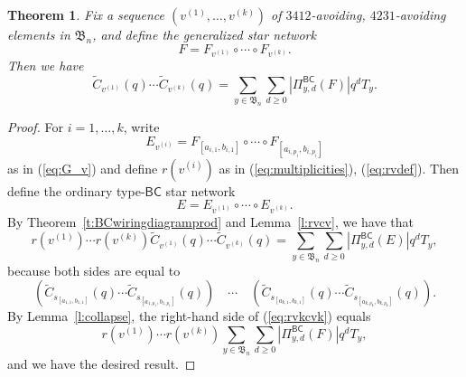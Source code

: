\documentclass[12pt]{amsart}
\newtheorem{thm}{Theorem}[section]
\theoremstyle{definition}
\numberwithin{equation}{section}
\newcommand{\bn}{\mathfrak{B}_n}
\newcommand{\wtc}[2]{\widetilde{C}_{#1}(#2)}
\newcommand{\pavoiding}{$3412$-avoiding, $4231$-avoiding }
\newcommand{\PiBC}{\Pi^{\msfBC}}
\newcommand{\msfBC}{\mathsf{BC}}
\begin{document}
\begin{thm}\label{t:BCwiringdiagramprod2}
Fix a sequence $(v^{(1)}, \dotsc, v^{(k)})$ of \pavoiding elements in $\bn$,
and define the generalized star network
\begin{equation}\label{eq:F}
  F = F_{v^{(1)}} \circ \cdots \circ F_{v^{(k)}}.
\end{equation}
Then we have
\begin{equation}\label{eq:cvk}
  \wtc{v^{(1)}}q \cdots \wtc{v^{(k)}}q = \sum_{y \in \bn}\sum_{d \geq 0} |\PiBC_{y,d}(F)|q^d T_y.
\end{equation}
\end{thm}
\begin{proof}
For $i = 1,\dotsc, k$, write 
\begin{equation*}
  E_{v^{(i)}} = F_{[a_{i,1}, b_{i,1}]} \circ \cdots \circ F_{[a_{i,p_i}, b_{i,p_i}]}
\end{equation*}
as in (\ref{eq:G_v})
and define
$r(v^{(i)})$             
as in (\ref{eq:multiplicities}),  (\ref{eq:rvdef}).  Then define the ordinary type-$\msfBC$ star network
\begin{equation}\label{eq:E}
    E = E_{v^{(1)}} \circ \cdots \circ E_{v^{(k)}}. 
\end{equation}
By Theorem~\ref{t:BCwiringdiagramprod} and Lemma~\ref{l:rvcv}, we have that
\begin{equation}\label{eq:rvkcvk}
    r(v^{(1)}) \cdots r(v^{(k)}) 
    \wtc{v^{(1)}}q \cdots \wtc{v^{(k)}}q = 
    \sum_{y \in \bn} \sum_{d \geq 0} |\PiBC_{y,d}(E)|q^d T_y,
\end{equation}
because both sides are equal to
\begin{equation*}
    (\wtc{s_{[a_{1,1},b_{1,1}]}}q \cdots \wtc{s_{[a_{1,p_1},b_{1,p_1}]}}q) 
    \quad \cdots \quad
    (\wtc{s_{[a_{k,1},b_{k,1}]}}q \cdots \wtc{s_{[a_{k,p_k},b_{k,p_k}]}}q).
\end{equation*}
By Lemma~\ref{l:collapse}, the right-hand side of (\ref{eq:rvkcvk}) equals
\begin{equation*}
r(v^{(1)}) \cdots r(v^{(k)})
\sum_{y \in \bn} \sum_{d \geq 0} |\PiBC_{y,d}(F)|q^d T_y,    
\end{equation*}
and we have the desired result.
    \end{proof}
\end{document}
